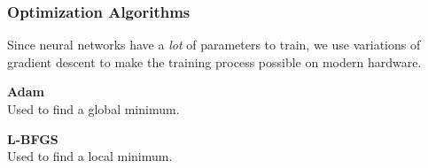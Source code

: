 \begin{frame}
    \frametitle{Optimization Algorithms}

    Since neural networks have a \textit{lot} of parameters to train, we use variations of gradient descent to make
    the training process possible on modern hardware.

    \bigskip
    \pause

    \textbf{Adam}
    \ \\
    \bigskip
    Used to find a global minimum.

    \pause
    \bigskip

    \textbf{L-BFGS}
    \ \\
    \bigskip
    Used to find a local minimum.
\end{frame}